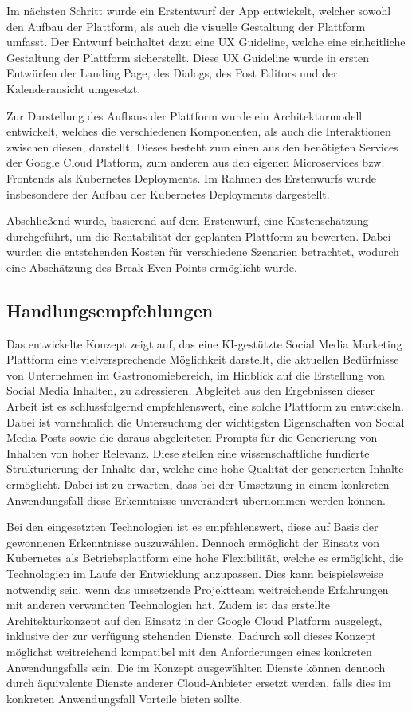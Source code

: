 Im nächsten Schritt wurde ein Erstentwurf der App entwickelt, welcher sowohl den Aufbau der Plattform, als auch die visuelle Gestaltung der Plattform umfasst.
Der Entwurf beinhaltet dazu eine UX Guideline, welche eine einheitliche Gestaltung der Plattform sicherstellt.
Diese UX Guideline wurde in ersten Entwürfen der Landing Page, des Dialogs, des Post Editors und der Kalenderansicht umgesetzt.

Zur Darstellung des Aufbaus der Plattform wurde ein Architekturmodell entwickelt, welches die verschiedenen Komponenten, als auch die Interaktionen zwischen diesen, darstellt.
Dieses besteht zum einen aus den benötigten Services der Google Cloud Platform, zum anderen aus den eigenen Microservices bzw. Frontends als Kubernetes Deployments.
Im Rahmen des Erstenwurfs wurde insbesondere der Aufbau der Kubernetes Deployments dargestellt.

Abschließend wurde, basierend auf dem Erstenwurf, eine Kostenschätzung durchgeführt, um die Rentabilität der geplanten Plattform zu bewerten.
Dabei wurden die entstehenden Kosten für verschiedene Szenarien betrachtet, wodurch eine Abschätzung des Break-Even-Points ermöglicht wurde.

\subsection{Handlungsempfehlungen}

Das entwickelte Konzept zeigt auf, das eine KI-gestützte Social Media Marketing Plattform eine vielversprechende Möglichkeit darstellt, die aktuellen Bedürfnisse von Unternehmen im Gastronomiebereich, im Hinblick auf die Erstellung von Social Media Inhalten, zu adressieren.
Abgleitet aus den Ergebnissen dieser Arbeit ist es schlussfolgernd empfehlenswert, eine solche Plattform zu entwickeln.
Dabei ist vornehmlich die Untersuchung der wichtigsten Eigenschaften von Social Media Posts sowie die daraus abgeleiteten Prompts für die Generierung von Inhalten von hoher Relevanz.
Diese stellen eine wissenschaftliche fundierte Strukturierung der Inhalte dar, welche eine hohe Qualität der generierten Inhalte ermöglicht.
Dabei ist zu erwarten, dass bei der Umsetzung in einem konkreten Anwendungsfall diese Erkenntnisse unverändert übernommen werden können.

Bei den eingesetzten Technologien ist es empfehlenswert, diese auf Basis der gewonnenen Erkenntnisse auszuwählen.
Dennoch ermöglicht der Einsatz von Kubernetes als Betriebsplattform eine hohe Flexibilität, welche es ermöglicht, die Technologien im Laufe der Entwicklung anzupassen.
Dies kann beispielsweise notwendig sein, wenn das umsetzende Projektteam weitreichende Erfahrungen mit anderen verwandten Technologien hat.
Zudem ist das erstellte Architekturkonzept auf den Einsatz in der Google Cloud Platform ausgelegt, inklusive der zur verfügung stehenden Dienste.
Dadurch soll dieses Konzept möglichst weitreichend kompatibel mit den Anforderungen eines konkreten Anwendungsfalls sein.
Die im Konzept ausgewählten Dienste können dennoch durch äquivalente Dienste anderer Cloud-Anbieter ersetzt werden, falls dies im konkreten Anwendungsfall Vorteile bieten sollte.

